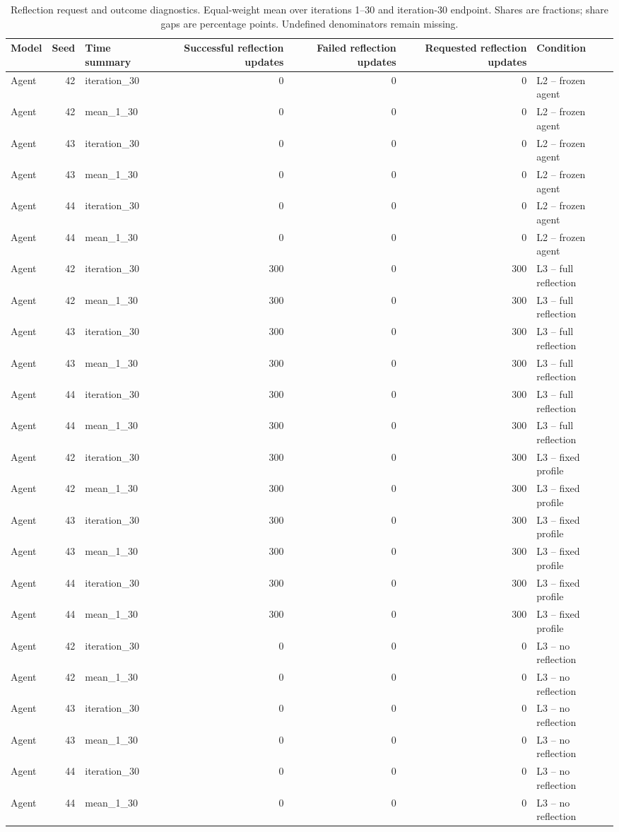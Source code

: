 \begin{table}[htbp!]
\centering
\small
\setlength{\tabcolsep}{3pt}
\renewcommand{\arraystretch}{1.1}
\begin{tabular}{lrlrrrl}
\hline
Model & Seed & Time summary & Successful reflection updates & Failed reflection updates & Requested reflection updates & Condition \\
\hline
Agent & 42 & iteration\_30 & 0 & 0 & 0 & L2 -- frozen agent \\
Agent & 42 & mean\_1\_30 & 0 & 0 & 0 & L2 -- frozen agent \\
Agent & 43 & iteration\_30 & 0 & 0 & 0 & L2 -- frozen agent \\
Agent & 43 & mean\_1\_30 & 0 & 0 & 0 & L2 -- frozen agent \\
Agent & 44 & iteration\_30 & 0 & 0 & 0 & L2 -- frozen agent \\
Agent & 44 & mean\_1\_30 & 0 & 0 & 0 & L2 -- frozen agent \\
Agent & 42 & iteration\_30 & 300 & 0 & 300 & L3 -- full reflection \\
Agent & 42 & mean\_1\_30 & 300 & 0 & 300 & L3 -- full reflection \\
Agent & 43 & iteration\_30 & 300 & 0 & 300 & L3 -- full reflection \\
Agent & 43 & mean\_1\_30 & 300 & 0 & 300 & L3 -- full reflection \\
Agent & 44 & iteration\_30 & 300 & 0 & 300 & L3 -- full reflection \\
Agent & 44 & mean\_1\_30 & 300 & 0 & 300 & L3 -- full reflection \\
Agent & 42 & iteration\_30 & 300 & 0 & 300 & L3 -- fixed profile \\
Agent & 42 & mean\_1\_30 & 300 & 0 & 300 & L3 -- fixed profile \\
Agent & 43 & iteration\_30 & 300 & 0 & 300 & L3 -- fixed profile \\
Agent & 43 & mean\_1\_30 & 300 & 0 & 300 & L3 -- fixed profile \\
Agent & 44 & iteration\_30 & 300 & 0 & 300 & L3 -- fixed profile \\
Agent & 44 & mean\_1\_30 & 300 & 0 & 300 & L3 -- fixed profile \\
Agent & 42 & iteration\_30 & 0 & 0 & 0 & L3 -- no reflection \\
Agent & 42 & mean\_1\_30 & 0 & 0 & 0 & L3 -- no reflection \\
Agent & 43 & iteration\_30 & 0 & 0 & 0 & L3 -- no reflection \\
Agent & 43 & mean\_1\_30 & 0 & 0 & 0 & L3 -- no reflection \\
Agent & 44 & iteration\_30 & 0 & 0 & 0 & L3 -- no reflection \\
Agent & 44 & mean\_1\_30 & 0 & 0 & 0 & L3 -- no reflection \\
\hline
\end{tabular}
\caption{Reflection request and outcome diagnostics. Equal-weight mean over iterations 1--30 and iteration-30 endpoint. Shares are fractions; share gaps are percentage points. Undefined denominators remain missing.}
\label{chap:results:tab:rq3_agents_reflection}
\end{table}
